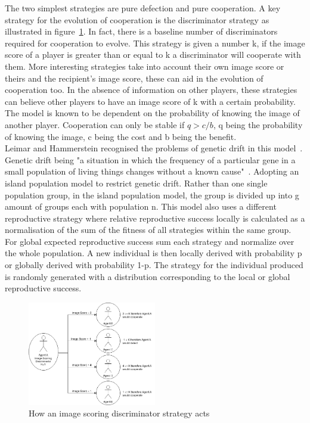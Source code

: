 \documentclass[twoside,twocolumn]{article}
\begin{document}
The two simplest strategies are pure defection and pure cooperation. A key strategy for the evolution of cooperation is the discriminator strategy as illustrated in figure~\ref{fig:image_discriminator}. In fact, there is a baseline number of discriminators required for cooperation to evolve. This strategy is given a number k, if the image score of a player is greater than or equal to k a discriminator will cooperate with them. More interesting strategies take into account their own image score or theirs and the recipient's image score, these can aid in the evolution of cooperation too. In the absence of information on other players, these strategies can believe other players to have an image score of k with a certain probability.\\
The model is known to be dependent on the probability of knowing the image of another player. Cooperation can only be stable if $q > c/b$, q being the probability of knowing the image, c being the cost and b being the benefit.\\
Leimar and Hammerstein recognised the problems of genetic drift in this model~\cite{leimarhammer}. Genetic drift being "a situation in which the frequency of a particular gene in a small population of living things changes without a known cause"~\cite{genetic_drift}. Adopting an island population model to restrict genetic drift. Rather than one single population group, in the island population model, the group is divided up into g amount of groups each with population n. This model also uses a different reproductive strategy where relative reproductive success locally is calculated as a normalisation of the sum of the fitness of all strategies within the same group. For global expected reproductive success sum each strategy and normalize over the whole population. A new individual is then locally derived with probability p or globally derived with probability 1-p. The strategy for the individual produced is randomly generated with a distribution corresponding to the local or global reproductive success.
\begin{figure}
	\includegraphics[width=0.5\textwidth]{Image_Scoring.png}
	\caption{How an image scoring discriminator strategy acts}
	\label{fig:image_discriminator}
\end{figure}
\end{document}
